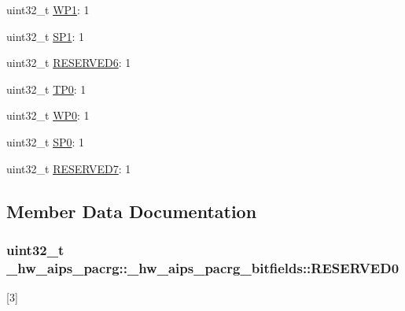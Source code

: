 \begin{DoxyCompactItemize}
\item 
uint32\+\_\+t \hyperlink{struct__hw__aips__pacrg_1_1__hw__aips__pacrg__bitfields_a66c535551fa7e545da88c2e570dde29b}{W\+P1}\+: 1
\item 
uint32\+\_\+t \hyperlink{struct__hw__aips__pacrg_1_1__hw__aips__pacrg__bitfields_a2292701f19ea49fd3e34f44c1ebf2637}{S\+P1}\+: 1
\item 
uint32\+\_\+t \hyperlink{struct__hw__aips__pacrg_1_1__hw__aips__pacrg__bitfields_ad2cb9ef99136cad4dddaa0843d296fb8}{R\+E\+S\+E\+R\+V\+E\+D6}\+: 1
\item 
uint32\+\_\+t \hyperlink{struct__hw__aips__pacrg_1_1__hw__aips__pacrg__bitfields_a19d567b38ec7fccf37e2de84e4b0fb13}{T\+P0}\+: 1
\item 
uint32\+\_\+t \hyperlink{struct__hw__aips__pacrg_1_1__hw__aips__pacrg__bitfields_a93c8fbc5d7c5cfc35c1dccaae070d864}{W\+P0}\+: 1
\item 
uint32\+\_\+t \hyperlink{struct__hw__aips__pacrg_1_1__hw__aips__pacrg__bitfields_a716f2155a143974fbabf88685288269e}{S\+P0}\+: 1
\item 
uint32\+\_\+t \hyperlink{struct__hw__aips__pacrg_1_1__hw__aips__pacrg__bitfields_a5e785248f9fcacf3644f95e32e9f29c5}{R\+E\+S\+E\+R\+V\+E\+D7}\+: 1
\end{DoxyCompactItemize}


\subsection{Member Data Documentation}
\subsubsection[{\texorpdfstring{R\+E\+S\+E\+R\+V\+E\+D0}{RESERVED0}}]{\setlength{\rightskip}{0pt plus 5cm}uint32\+\_\+t \+\_\+hw\+\_\+aips\+\_\+pacrg\+::\+\_\+hw\+\_\+aips\+\_\+pacrg\+\_\+bitfields\+::\+R\+E\+S\+E\+R\+V\+E\+D0}\hypertarget{struct__hw__aips__pacrg_1_1__hw__aips__pacrg__bitfields_abbd851229f92b400091f0e1df258aa66}{}\label{struct__hw__aips__pacrg_1_1__hw__aips__pacrg__bitfields_abbd851229f92b400091f0e1df258aa66}
\mbox{[}3\mbox{]} 
